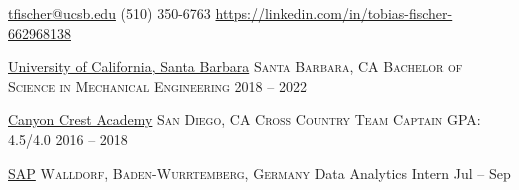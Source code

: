 \documentclass[11pt,a4paper]{article}
\begin{document}
\sloppy  %



\nobreakvspace{0.3em}  %

\noindent\href{mailto:tfischer@ucsb.edu}{tfischer@ucsb.edu}\sbull
(510) 350-6763 \sbull
\href{https://linkedin.com/in/tobias-fischer-662968138
}{https://linkedin.com/in/tobias-fischer-662968138
}


\spacedhrule{0.4em}{-0.6em}  %


\headedsection
{\href{https://engineering.ucsb.edu/}{University of California, Santa Barbara}}
{\textsc{Santa Barbara, CA}} {%
	\headedsubsection
	{\textsc{Bachelor of Science in Mechanical Engineering}}
	{2018 -- 2022}{}
}

\headedsection
{\href{http://cc.sduhsd.net/}{Canyon Crest Academy}}
{\textsc{San Diego, CA}} {%
	\headedsubsection
	{\textsc{Cross Country Team Captain \bull \hspace{0.1em} GPA: 4.5/4.0}}
	{2016 -- 2018}
	{}
}

\spacedhrule{0.4em}{-0.6em}


\headedsection  %
  {\href{https://www.sap.com/index.html}{SAP}}
  {\textsc{Walldorf, Baden-Wurrtemberg, Germany}} {
  \headedsubsection
    {Data Analytics Intern}
    {Jul  -- Sep }
    {}
}
\end{document}
